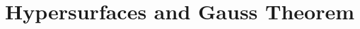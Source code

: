 \section{Hypersurfaces and Gauss Theorem}
\begin{comment}
The purpose of this chapter is to introduce \emph{non-null hypersurfaces} within $\M$ and their \emph{induced metric}. Understanding these concepts is essential for grasping \emph{Gauss' theorem}, which is crucial for integrating the action by parts. Additionally, we aim to introduce the notion of \emph{extrinsic curvature} of hypersurfaces, which plays a crucial role in constructing the Gibbons-Hawking-York boundary term.

We take for granted that given any smooth oriented coordinates $\phi = \{x^i\}$ on $\V \subseteq \M$, the \emph{metric volume form} has the local coordinate expression
\begin{equation}\label{eq:volume-metric-form}
   \ud V_g = \sg \, \ud x^1 \wedge \dots \wedge \ud x^4 ,
\end{equation}
and can be used to integrate a function $f$ over $\V$ by
\begin{equation}\label{eq:integration-metric-manifold}
    \int_{\V} f \ud V_g = \int_{\phi(\V)} (\phi^{-1})^* (f \ud V_g) = \int_{\phi(\V)} f(x) \sg \,\udq x .
\end{equation}

The derivation of the previous formulas can be found in any standard textbooks like~\cite[Lee]{lee:smooth} or~\cite[Poisson]{poisson:relativity}. Henceforth, we adopt a simplified notation, integrating over $\V$ for both the differential forms and their coordinate representation, without explicit reference to the chart $\phi$.


\subsection{Hypersurfaces on a Manifold} 
A \emph{hypersurface} $\Sigma$ is a three-dimensional submanifold embedded in $\M$, which can be either spacelike or timelike. We omit the consideration of the null case due to its increased technical complexity. The hypersurface can be described either by a scalar function $\Phi(x^\mu) = 0$ or by a parametric equation $x^\mu = x^\mu (y^a)$, where $y^a$ are intrinsic coordinates of the hypersurface. The coordinate basis vectors related to $y^a$, and their dual forms, are given by\footnote{In particular, $\frac{\de}{\de y^a} = \frac{\de x^\mu}{\de y^a} \frac{\de}{\de x^\mu} = \e{\mu}{a} \frac{\de}{\de x^\mu}$. Referring to “\emph{vectors}”, we understand their coordinates with respect to the coordinate basis of $x^\mu$.}
\begin{equation}
    \e{\mu}{a} = \frac{\de x^\mu}{\de y^a}, \quad \due{\mu}{a} = \frac{\de y^a}{\de x^\mu} ,
\end{equation}
with respect to the basis $\de_\mu$. They are related by $\e{\mu}{b} \due{\mu}{a} = \delta^a_b$.


\end{comment}
